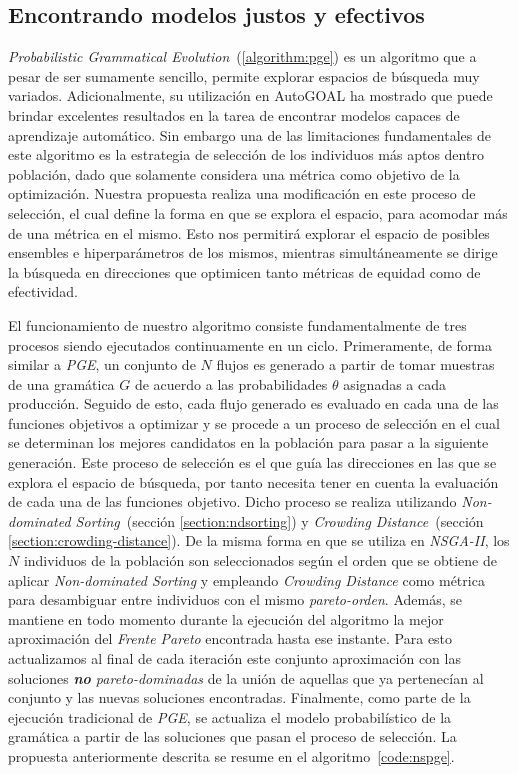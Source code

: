 \subsection{Encontrando modelos justos y efectivos}

\emph{Probabilistic Grammatical Evolution}~(\ref{algorithm:pge}) es un algoritmo que a pesar de ser sumamente sencillo, permite explorar espacios de búsqueda muy variados.
Adicionalmente, su utilización en AutoGOAL ha mostrado que puede brindar excelentes resultados en la tarea de encontrar modelos capaces de aprendizaje automático.
Sin embargo una de las limitaciones fundamentales de este algoritmo es la estrategia de selección de los individuos más aptos dentro población, dado que solamente considera una métrica como objetivo de la optimización.
Nuestra propuesta realiza una modificación en este proceso de selección, el cual define la forma en que se explora el espacio, para acomodar más de una métrica en el mismo.
Esto nos permitirá explorar el espacio de posibles ensembles e hiperparámetros de los mismos, mientras simultáneamente se dirige la búsqueda en direcciones que optimicen tanto métricas de equidad como de efectividad.

El funcionamiento de nuestro algoritmo consiste fundamentalmente de tres procesos siendo ejecutados continuamente en un ciclo.
Primeramente, de forma similar a \emph{PGE}, un conjunto de $N$ flujos es generado a partir de tomar muestras de una gramática $G$ de acuerdo a las probabilidades $\theta$ asignadas a cada producción.
Seguido de esto, cada flujo generado es evaluado en cada una de las funciones objetivos a optimizar y se procede a un proceso de selección en el cual se determinan los mejores candidatos en la población para pasar a la siguiente generación.
Este proceso de selección es el que guía las direcciones en las que se explora el espacio de búsqueda, por tanto necesita tener en cuenta la evaluación de cada una de las funciones objetivo.
Dicho proceso se realiza utilizando \emph{Non-dominated Sorting}~(sección \ref{section:ndsorting}) y \emph{Crowding Distance}~(sección \ref{section:crowding-distance}).
De la misma forma en que se utiliza en \emph{NSGA-II}, los $N$ individuos de la población son seleccionados según el orden que se obtiene de aplicar \emph{Non-dominated Sorting} y empleando \emph{Crowding Distance} como métrica para desambiguar entre individuos con el mismo \emph{pareto-orden}.
Además, se mantiene en todo momento durante la ejecución del algoritmo la mejor aproximación del \emph{Frente Pareto} encontrada hasta ese instante.
Para esto actualizamos al final de cada iteración este conjunto aproximación con las soluciones \emph{\textbf{no} pareto-dominadas} de la unión de aquellas que ya pertenecían al conjunto y las nuevas soluciones encontradas.
Finalmente, como parte de la ejecución tradicional de \emph{PGE}, se actualiza el modelo probabilístico de la gramática a partir de las soluciones que pasan el proceso de selección.
La propuesta anteriormente descrita se resume en el algoritmo~\ref{code:nspge}.


